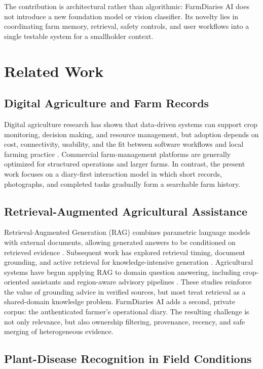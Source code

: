 \documentclass[conference]{IEEEtran}
\begin{document}
The contribution is architectural rather than algorithmic: FarmDiaries AI does not introduce a new foundation model or vision classifier. Its novelty lies in coordinating farm memory, retrieval, safety controls, and user workflows into a single testable system for a smallholder context.

\section{Related Work}

\subsection{Digital Agriculture and Farm Records}

Digital agriculture research has shown that data-driven systems can support crop monitoring, decision making, and resource management, but adoption depends on cost, connectivity, usability, and the fit between software workflows and local farming practice \cite{kamilaris2018}. Commercial farm-management platforms are generally optimized for structured operations and larger farms. In contrast, the present work focuses on a diary-first interaction model in which short records, photographs, and completed tasks gradually form a searchable farm history.

\subsection{Retrieval-Augmented Agricultural Assistance}

Retrieval-Augmented Generation (RAG) combines parametric language models with external documents, allowing generated answers to be conditioned on retrieved evidence \cite{lewis2020}. Subsequent work has explored retrieval timing, document grounding, and active retrieval for knowledge-intensive generation \cite{jiang2023flare}. Agricultural systems have begun applying RAG to domain question answering, including crop-oriented assistants and region-aware advisory pipelines \cite{shizishan2024,agriregion2025}. These studies reinforce the value of grounding advice in verified sources, but most treat retrieval as a shared-domain knowledge problem. FarmDiaries AI adds a second, private corpus: the authenticated farmer's operational diary. The resulting challenge is not only relevance, but also ownership filtering, provenance, recency, and safe merging of heterogeneous evidence.

\subsection{Plant-Disease Recognition in Field Conditions}
\end{document}
